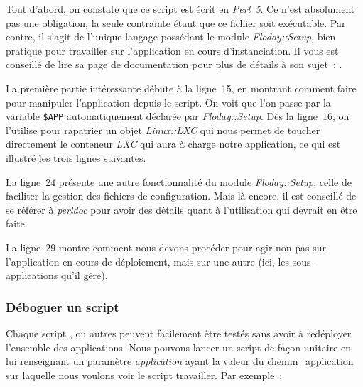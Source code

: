 

Tout d'abord, on constate que ce script est écrit en \emph{Perl~5}.
Ce n'est absolument pas une obligation, la seule contrainte étant que ce fichier soit exécutable.
Par contre, il s'agit de l'unique langage possédant le module \emph{Floday::Setup}, bien pratique pour travailler sur l'\gls{application} en cours d'instanciation.
Il vous est conseillé de lire sa page de documentation pour plus de détails à son sujet~: .

La première partie intéressante débute à la ligne~15, en montrant comment faire pour manipuler l'application depuis le script.
On voit que l'on passe par la variable {\tt\$APP} automatiquement déclarée par \emph{Floday::Setup}.
Dès la ligne~16, on l'utilise pour rapatrier un objet \emph{Linux::LXC} qui nous permet de toucher directement le conteneur \emph{LXC} qui aura à charge notre application, ce qui est illustré les trois lignes suivantes.

La ligne~24 présente une autre fonctionnalité du module \emph{Floday::Setup}, celle de faciliter la gestion des fichiers de configuration.
Mais là encore, il est conseillé de se référer à \emph{perldoc} pour avoir des détails quant à l'utilisation qui devrait en être faite.

La ligne~29 montre comment nous devons procéder pour agir non pas sur l'application en cours de déploiement, mais sur une autre (ici, les \glspl{sous-application} qu'il gère).

\subsubsection{Déboguer un script}

Chaque script ,  ou autres peuvent facilement être testés sans avoir à redéployer l'ensemble des applications.
Nous pouvons lancer un script de façon unitaire en lui renseignant un paramètre \emph{application} ayant la valeur du \gls{chemin_application} sur laquelle nous voulons voir le script travailler.
Par exemple~:


